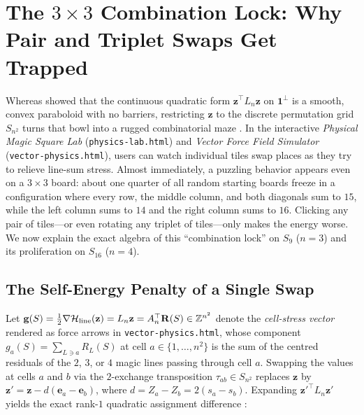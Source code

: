 \section{The \texorpdfstring{$3\times 3$}{3x3} Combination Lock: Why Pair and Triplet Swaps Get Trapped}
\label{sec:landscape}

Whereas  showed that the continuous quadratic form $\mathbf{z}^\top L_n \mathbf{z}$ on $\mathbf{1}^\perp$ is a smooth, convex paraboloid with no barriers, restricting $\mathbf{z}$ to the discrete permutation grid $S_{n^2}$ turns that bowl into a rugged combinatorial maze \cite{codognet2001yet,vanhentenryck2005constraint}. In the interactive \emph{Physical Magic Square Lab} (\texttt{physics-lab.html}) and \emph{Vector Force Field Simulator} (\texttt{vector-physics.html}), users can watch individual tiles swap places as they try to relieve line-sum stress. Almost immediately, a puzzling behavior appears even on a $3\times 3$ board: about one quarter of all random starting boards freeze in a configuration where every row, the middle column, and both diagonals sum to $15$, while the left column sums to $14$ and the right column sums to $16$. Clicking any pair of tiles---or even rotating any triplet of tiles---only makes the energy worse. We now explain the exact algebra of this ``combination lock'' on $S_9$ ($n=3$) and its proliferation on $S_{16}$ ($n=4$).

\subsection{The Self-Energy Penalty of a Single Swap}

Let $\mathbf{g}(S) = \frac{1}{2}\nabla \mathcal{H}_{\mathrm{line}}(\mathbf{z}) = L_n \mathbf{z} = A_n^\top \mathbf{R}(S) \in \mathbb{Z}^{n^2}$ denote the \emph{cell-stress vector} rendered as force arrows in \texttt{vector-physics.html}, whose component $g_a(S) = \sum_{L\ni a} R_L(S)$ at cell $a \in \{1,\dots,n^2\}$ is the sum of the centred residuals of the $2$, $3$, or $4$ magic lines passing through cell $a$. Swapping the values at cells $a$ and $b$ via the $2$-exchange transposition $\tau_{ab} \in S_{n^2}$ replaces $\mathbf{z}$ by $\mathbf{z}' = \mathbf{z} - d(\mathbf{e}_a - \mathbf{e}_b)$, where $d = Z_a - Z_b = 2(s_a - s_b)$. Expanding $\mathbf{z}'^\top L_n \mathbf{z}'$ yields the exact rank-$1$ quadratic assignment difference \cite{vanhentenryck2005constraint}:

